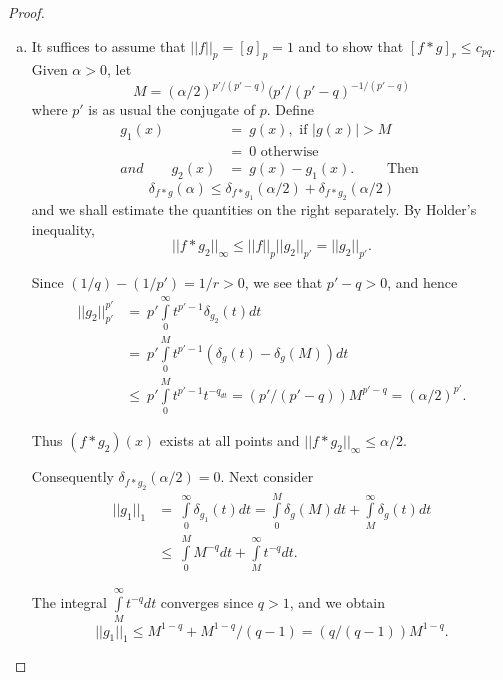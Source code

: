 \begin{proof}%
  \begin{enumerate}[a)]
  \item It suffices to assume that $|| f ||_p = [g]_p = 1$ and to show
    that $[f * g]_r \le c_{pq}$. Given $\alpha > 0$, let 
    $$
    M = (\alpha/2)^{p'/(p'-q)} (p'/(p'-q)^{-1/(p'-q)}
    $$
    where $p'$ is as usual the conjugate of $p$. Define
    \begin{align*}
      g_1 (x) & = ~ g(x), \text { if } | g (x) | > M\\
      & = ~ 0 \text { otherwise}\\
      and \qquad g_2(x) & = ~ g(x) - g_1 (x). \qquad \text { Then }
    \end{align*}\pageoriginale
    $$
    \delta_{f * g} (\alpha) \le \delta_{f * g_1} (\alpha/2) + \delta_{f *
      g_2} (\alpha/2) 
    $$
    and we shall estimate the quantities on the right separately. By
    Holder's inequality, 
    $$
    || f * g_2 ||_{\infty} \le || f ||_p || g_2 ||_{p'} = || g_2 ||_{p'}.
    $$
        
    Since $(1/q) - (1/p') = 1/r > 0$, we see that $p' -  q > 0$, and hence 
    \begin{align*}
      || g_2 ||^{p'}_{p'} & = ~ p' \int\limits_{0}^{\infty} t^{p' - 1}
      \delta_{g_2} (t) dt\\ 
      & = ~ p' \int\limits_{0}^{M} t^{p' - 1} (\delta_g (t) - \delta_g (M)) dt\\
      & \le ~ p' \int\limits_{0}^{M} t^{p' - 1} t^{-q_{dt}} = (p'/(p'-q))
      M^{p' - q} = (\alpha/2)^{p'}. 
    \end{align*}
    
    Thus $(f * g_2) (x)$ exists at all points and $|| f * g_2 ||_{\infty}
    \le \alpha/2$. 
    
    Consequently $\delta_{f * g_2} (\alpha/2) = 0$. Next consider
    \begin{align*}
      || g_1 ||_1 & = ~ \int\limits_{0}^{\infty} \delta_{g_1} (t) dt =
      \int\limits_{0}^{M} \delta_g (M) dt + \int\limits_{M}^{\infty}
      \delta_g (t) dt \\ 
      & \le ~ \int\limits_{0}^{M} M^{-q} dt + \int\limits_{M}^{\infty}
      t^{-q} dt. 
    \end{align*}
    
    The integral $\int\limits_{M}^{\infty} t^{-q} dt$ converges since $q >
    1$, and we obtain  
    $$
    || g_1 ||_1 \le M^{1-q}+M^{1-q}/(q-1) = (q/(q-1)) M^{1-q}.
    $$
    

\end{enumerate}
\end{proof}
